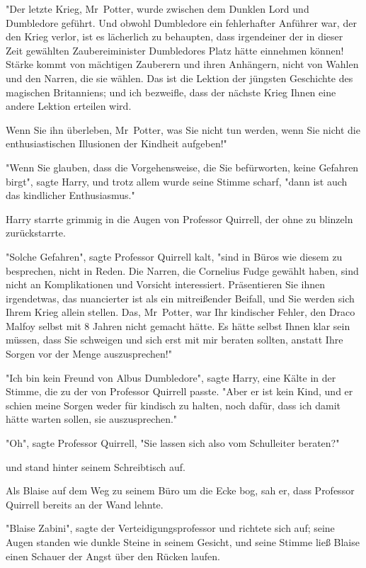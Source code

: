 {"Der letzte Krieg, Mr~Potter, wurde zwischen dem Dunklen Lord und Dumbledore geführt. Und obwohl Dumbledore ein fehlerhafter Anführer war, der den Krieg verlor, ist es lächerlich zu behaupten, dass irgendeiner der in dieser Zeit gewählten Zaubereiminister Dumbledores Platz hätte einnehmen können! Stärke kommt von mächtigen Zauberern und ihren Anhängern, nicht von Wahlen und den Narren, die sie wählen. Das ist die Lektion der jüngsten Geschichte des magischen Britanniens; und ich bezweifle, dass der nächste Krieg Ihnen eine andere Lektion erteilen wird.

Wenn Sie ihn überleben, Mr~Potter, was Sie nicht tun werden, wenn Sie nicht die enthusiastischen Illusionen der Kindheit aufgeben!"

"Wenn Sie glauben, dass die Vorgehensweise, die Sie befürworten, keine Gefahren birgt", sagte Harry, und trotz allem wurde seine Stimme scharf, "dann ist auch das kindlicher Enthusiasmus."

Harry starrte grimmig in die Augen von Professor Quirrell, der ohne zu blinzeln zurückstarrte.

"Solche Gefahren", sagte Professor Quirrell kalt, "sind in Büros wie diesem zu besprechen, nicht in Reden. Die Narren, die Cornelius Fudge gewählt haben, sind nicht an Komplikationen und Vorsicht interessiert. Präsentieren Sie ihnen irgendetwas, das nuancierter ist als ein mitreißender Beifall, und Sie werden sich Ihrem Krieg allein stellen. Das, Mr~Potter, war Ihr kindischer Fehler, den Draco Malfoy selbst mit 8 Jahren nicht gemacht hätte. Es hätte selbst Ihnen klar sein müssen, dass Sie schweigen und sich erst mit mir beraten sollten, anstatt Ihre Sorgen vor der Menge auszusprechen!"

"Ich bin kein Freund von Albus Dumbledore", sagte Harry, eine Kälte in der Stimme, die zu der von Professor Quirrell passte. "Aber er ist kein Kind, und er schien meine Sorgen weder für kindisch zu halten, noch dafür, dass ich damit hätte warten sollen, sie auszusprechen."

"Oh", sagte Professor Quirrell, "Sie lassen sich also vom Schulleiter beraten?"

und stand hinter seinem Schreibtisch auf.

Als Blaise auf dem Weg zu seinem Büro um die Ecke bog, sah er, dass Professor Quirrell bereits an der Wand lehnte.

"Blaise Zabini", sagte der Verteidigungsprofessor und richtete sich auf; seine Augen standen wie dunkle Steine in seinem Gesicht, und seine Stimme ließ Blaise einen Schauer der Angst über den Rücken laufen.

}
